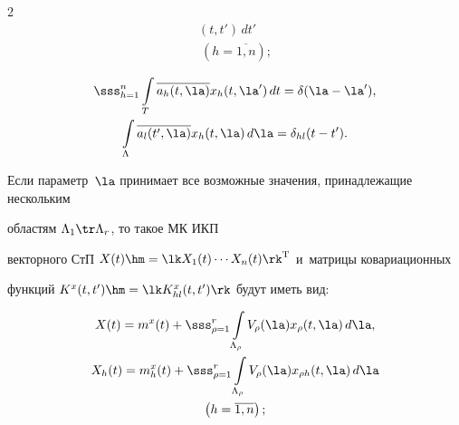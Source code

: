 \begin{multicols}{2}
\begin{multline}
(t,t') \,dt' \\\

 \left(h=\overline{1,n}\right);

\label{e2.3-s2}

\end{multline}



\vspace*{-12pt}



\noindent

\begin{multline}

\sss_{h=1}^n \int\limits_T \overline{a_h(t,\la)} x_h (t, \la') \,dt = \delta (\la-\la'),\\

    \int\limits_\Lambda \overline{a_l(t',\la)} x_h (t, \la)\, d\la = \delta_{hl} (t-t').

    \label{e2.4-s2}

    \end{multline}

    



Если параметр~$\la$ принимает все возможные значения, принадлежащие нескольким 

областям $\Lambda_1\tr \Lambda_r$, то такое МК ИКП 

векторного СтП $X(t) \hm=\lk X_1(t) \cdots X_n(t)\rk^{\mathrm{T}}$ и~матрицы ковариационных 

функций $K^x (t,t') \hm= \lk K_{hl}^x (t,t')\rk$  будут иметь вид:

  \begin{multline}

    X(t) = m^x (t) +\sss_{\rho =1}^r \int\limits_{\Lambda_\rho} V_\rho (\la) x_\rho 

(t,\la) \,d\la,

\\

    X_h(t) = m_h^x(t) +\sss_{\rho =1}^r \int\limits_{\Lambda_\rho} V_\rho (\la) 

x_{\rho h} (t,\la) \,d\la\\

 \left(h=\overline{1,n}\right);

\label{e2.5-s2}

\end{multline}



\vspace*{-12pt}




\end{multicols}
